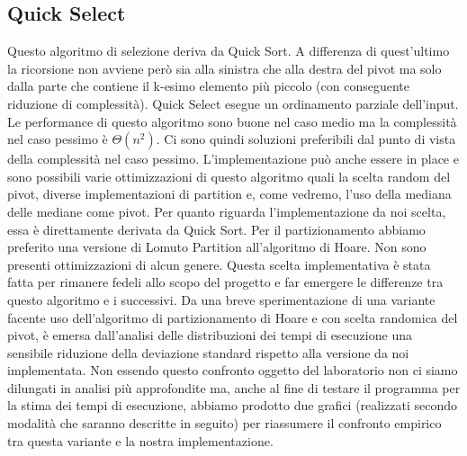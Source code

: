 \documentclass{article}
\begin{document}
\subsection{Quick Select}
Questo algoritmo di selezione deriva da Quick Sort.
\newline
\newline
A differenza di quest'ultimo la ricorsione non avviene però sia alla sinistra che alla destra del pivot ma solo dalla parte che contiene il k-esimo elemento più piccolo (con conseguente riduzione di complessità).
\newline
\newline
Quick Select esegue un ordinamento parziale dell'input.
\newline
\newline
Le performance di questo algoritmo sono buone nel caso medio ma la complessità nel caso pessimo è $\Theta(n^2)$.
\newline
Ci sono quindi soluzioni preferibili dal punto di vista della complessità nel caso pessimo.
\newline
\newline
L'implementazione può anche essere in place e sono possibili varie ottimizzazioni di questo algoritmo quali la scelta random del pivot, diverse implementazioni di partition e, come vedremo, l'uso della mediana delle mediane come pivot.
\newline
\newline
Per quanto riguarda l'implementazione da noi scelta, essa è direttamente derivata da Quick Sort.
\newline
Per il partizionamento abbiamo preferito una versione di Lomuto Partition all'algoritmo di Hoare.
\newline
\newline
Non sono presenti ottimizzazioni di alcun genere.
\newline
Questa scelta implementativa è stata fatta per rimanere fedeli allo scopo del progetto e far emergere le differenze tra questo algoritmo e i successivi.
\newline
\newline
Da una breve sperimentazione di una variante facente uso dell'algoritmo di partizionamento di Hoare  e con scelta randomica del pivot, è emersa dall'analisi delle distribuzioni dei tempi di esecuzione una sensibile riduzione della deviazione standard rispetto alla versione da noi implementata.
\newline
\newline
Non essendo questo confronto oggetto del laboratorio non ci siamo dilungati in analisi più approfondite ma, anche al fine di testare il programma per la stima dei tempi di esecuzione, abbiamo prodotto due grafici (realizzati secondo modalità che saranno descritte in seguito) per riassumere il confronto empirico tra questa variante e la nostra implementazione.
\end{document}
